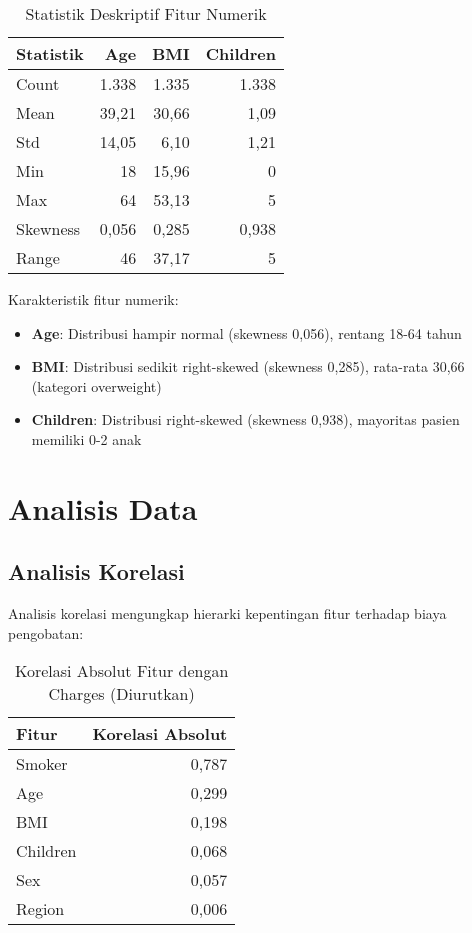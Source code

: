 \begin{table}[H]
\centering
\caption{Statistik Deskriptif Fitur Numerik}
\label{tab:numeric-stats}
\begin{tabular}{|l|r|r|r|}
\hline
\textbf{Statistik} & \textbf{Age} & \textbf{BMI} & \textbf{Children} \\
\hline
Count & 1.338 & 1.335 & 1.338 \\
Mean & 39,21 & 30,66 & 1,09 \\
Std & 14,05 & 6,10 & 1,21 \\
Min & 18 & 15,96 & 0 \\
Max & 64 & 53,13 & 5 \\
Skewness & 0,056 & 0,285 & 0,938 \\
Range & 46 & 37,17 & 5 \\
\hline
\end{tabular}
\end{table}

Karakteristik fitur numerik:
\begin{itemize}
    \item \textbf{Age}: Distribusi hampir normal (skewness 0,056), rentang 18-64 tahun
    \item \textbf{BMI}: Distribusi sedikit right-skewed (skewness 0,285), rata-rata 30,66 (kategori overweight)
    \item \textbf{Children}: Distribusi right-skewed (skewness 0,938), mayoritas pasien memiliki 0-2 anak
\end{itemize}

\section{Analisis Data}
\label{sec:analisis-data}

\subsection{Analisis Korelasi}
\label{subsec:analisis-korelasi}

Analisis korelasi mengungkap hierarki kepentingan fitur terhadap biaya pengobatan:

\begin{table}[H]
\centering
\caption{Korelasi Absolut Fitur dengan Charges (Diurutkan)}
\label{tab:correlation-ranking}
\begin{tabular}{|l|r|}
\hline
\textbf{Fitur} & \textbf{Korelasi Absolut} \\
\hline
Smoker & 0,787 \\
Age & 0,299 \\
BMI & 0,198 \\
Children & 0,068 \\
Sex & 0,057 \\
Region & 0,006 \\
\hline
\end{tabular}
\end{table}

